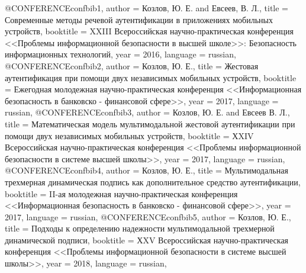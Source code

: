 @CONFERENCE{confbib1,
  author = {Козлов, Ю. Е. and Евсеев, В. Л.},
  title = {Современные методы речевой аутентификации в приложениях мобильных устройств},
  booktitle = {XXIII Всероссийская научно-практическая конференция <<Проблемы информационной безопасности в высшей школе>>: Безопасность информационных технологий},
  year = {2016},
  language = {russian},
}
@CONFERENCE{confbib2,
  author = {Козлов, Ю. Е.},
  title = {Жестовая аутентификация при помощи двух независимых мобильных устройств},
  booktitle = {Ежегодная молодежная научно-практическая конференция <<Информационная безопасность в банковско - финансовой сфере>>},
  year = {2017},
  language = {russian},
}
@CONFERENCE{confbib3,
	author = {Козлов, Ю. Е. and Евсеев В. Л.},
	title = {Математическая модель мультимодальной жестовой аутентификации при помощи двух независимых мобильных устройств},
	booktitle = {ХXIV Всероссийская научно-практическая конференция <<Проблемы информационной безопасности в системе высшей школы>>},
	year = {2017},
	language = {russian},
}
@CONFERENCE{confbib4,
	author = {Козлов, Ю. Е.},
	title = {Мультимодальная трехмерная динамическая подпись как дополнительное средство аутентификации},
	booktitle = {II-ая молодежная научно-практическая конференция <<Информационная безопасность в банковско - финансовой сфере>>},
	year = {2017},
	language = {russian},
}
@CONFERENCE{confbib5,
	author = {Козлов, Ю. Е.},
	title = {Подходы к определению надежности мультимодальной трехмерной динамической подписи},
	booktitle = {ХXV Всероссийская научно-практическая конференция <<Проблемы информационной безопасности в системе высшей школы>>},
	year = {2018},
    language = {russian},
}